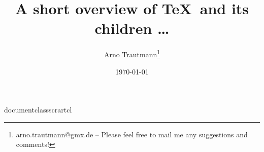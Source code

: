 documentclass{scrartcl}

\usepackage{
  cooltooltips,
  dtklogos,
  geometry,
  hyperref,
  lmodern,
  natbib,
  tikz
}

\geometry{
  margin=1cm
}
\hypersetup{
  colorlinks=true,
  linkcolor=blue,
  urlcolor=blue,
  pdfborder=0 0 0
}

\def\XeT{XET}
\def\Aleph{Aleph}
\def\XeLaTeX{Xe\LaTeX}
\def\ConTeXt{Con\TeX{}t}

\def\vip{1 0 0}
\def\other{0 0 0}
\def\normalimportant{0 0.5 0}
\def\experimental{0 .7 .7}

\newcommand\mynode[5][\normalimportant]{
  \node (#2) at (#3) {
    \cooltooltip[#1]{#2}{#4}{#4}{}{#5\strut}
  };
  \expandafter\def\csname texname#2\endcsname{#4}
  \AtEndDocument{\subsubsection*{\color{blue}#5}\parbox{\textwidth}{#4}}
}


\newlength{\layer}\setlength{\layer}{0cm}
\def\setlayer#1{\setlength{\layer}{#1cm}}
\newcommand\steplayer[1][-1]{\addtolength{\layer}{#1cm}}%

\title{A short overview of \TeX\ and its children \dots}
\author{Arno Trautmann\thanks{arno.trautmann@gmx.de -- Please feel free to mail me any suggestions and comments!}}
\date{\today}
\pagestyle{empty}

\newcommand\overviewsubsection[2][]{\subsection[#1]{#2}\AtEndDocument{\subsection[#1]{#2}}}


\maketitle

